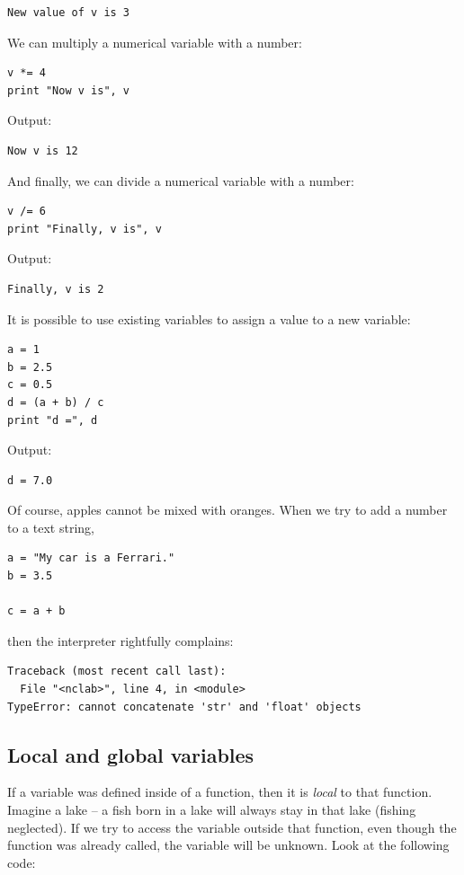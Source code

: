 \begin{verbatim}
New value of v is 3
\end{verbatim}
We can multiply a numerical variable with a number:

\begin{verbatim}
v *= 4
print "Now v is", v
\end{verbatim}
Output:

\begin{verbatim}
Now v is 12
\end{verbatim}
And finally, we can divide a numerical variable with a number:

\begin{verbatim}
v /= 6
print "Finally, v is", v
\end{verbatim}
Output:

\begin{verbatim}
Finally, v is 2
\end{verbatim}
It is possible to use existing variables to assign a value to a new variable:

\begin{verbatim}
a = 1
b = 2.5
c = 0.5
d = (a + b) / c
print "d =", d
\end{verbatim}
Output:

\begin{verbatim}
d = 7.0
\end{verbatim}
Of course, apples cannot be mixed with oranges. When we try to 
add a number to a text string,

\begin{verbatim}
a = "My car is a Ferrari."
b = 3.5

c = a + b
\end{verbatim}
then the interpreter rightfully complains:

\begin{verbatim}
Traceback (most recent call last):
  File "<nclab>", line 4, in <module>
TypeError: cannot concatenate 'str' and 'float' objects
\end{verbatim}

\subsection{Local and global variables}

If a variable was defined inside of a function, then it is {\em local} to that
function. Imagine a lake -- a fish born in a lake will always 
stay in that lake (fishing neglected). If we try to access 
the variable outside that function, even though the function was 
already called, the variable will be unknown. Look at the following 
code:

